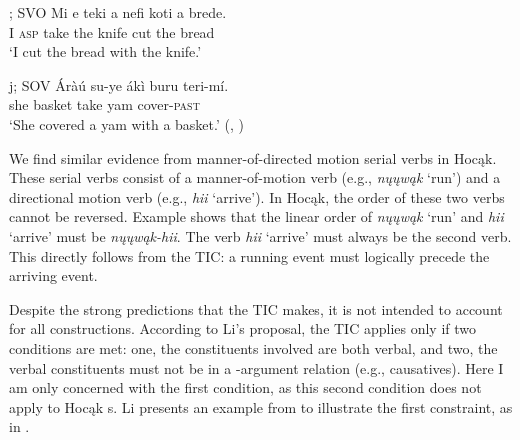 \documentclass[output=paper]{LSP/langsci}
\begin{document}
\begin{exe}
\ex\label{ex:rosen:35}
\begin{xlist}

\ex {}; SVO
\gll Mi e teki a nefi koti a brede. \\
I \textsc{asp} take the knife cut the bread \\
\glt `I cut the bread with the knife.'

\ex {}j; SOV
 \gll \'Aràú su-ye ákì buru teri-mí. \\
she basket take yam cover-\textsc{past}\\
\glt `She covered a yam with a basket.' (\citealt[500]{Li1993}, )

\end{xlist}
\end{exe}

We find similar evidence from manner-of-directed motion serial verbs in Hocąk. These serial verbs consist of a manner-of-motion verb (e.g., \textit{nųųwąk} `run') and a directional motion verb (e.g., \textit{hii} `arrive'). In Hocąk, the order of these two verbs cannot be reversed. Example  shows that the linear order of \textit{nųųwąk} `run' and \textit{hii} `arrive' must be \textit{nųųwąk-hii}. The verb \textit{hii} `arrive' must always be the second verb. This directly follows from the TIC: a running event must logically precede the arriving event.

\begin{exe}
\ex\label{ex:rosen:36}
\begin{xlist}



\end{xlist}
\end{exe}

Despite the strong predictions that the TIC makes, it is not intended to account for all  constructions. According to Li's proposal, the TIC applies only if two conditions are met: one, the constituents involved are both verbal, and two, the verbal constituents must not be in a -argument relation (e.g., causatives). Here I am only concerned with the first condition, as this second condition does not apply to Hocąk s. Li presents an example from  to illustrate the first constraint, as in .
\end{document}
